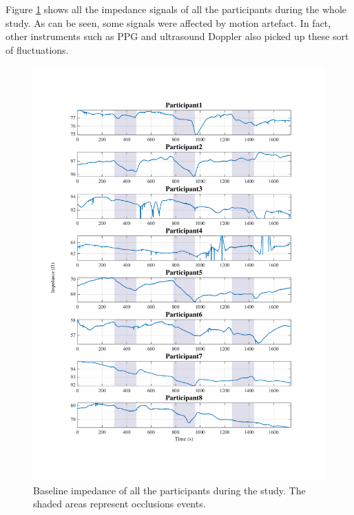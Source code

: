 
Figure \ref{fig:rb:all_participants} shows all the impedance signals of all the participants during the whole study. As can be seen, some signals were affected by motion artefact. In fact, other instruments such as PPG and ultrasound Doppler also picked up these sort of fluctuations. 

\begin{figure}
	\includegraphics[width=\textwidth,height=\textheight,keepaspectratio]{figure1}    
	\caption{Baseline impedance of all the participants during the study. The shaded areas represent occlusions events.}
	\label{fig:rb:all_participants}
\end{figure}


